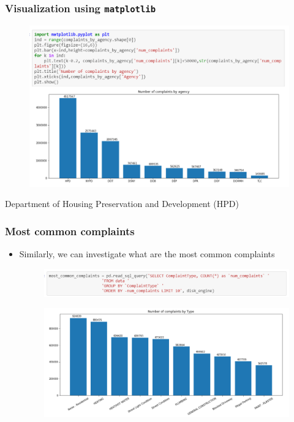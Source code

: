 \documentclass[red]{beamer}
\begin{document}
\begin{frame}
\frametitle{Visualization using \texttt{matplotlib}}
\begin{figure}
	\centering
	\includegraphics[width=1\linewidth]{figure/screenshot007}
\end{figure}
\vspace{-5mm}
Department of Housing Preservation and Development (HPD) 
\end{frame}

\begin{frame}
\frametitle{Most common complaints}
\begin{itemize}
	\item Similarly, we can investigate what are the most common complaints
	\begin{figure}
		\centering
		\includegraphics[width=1\linewidth]{figure/screenshot008}
	\end{figure}
	
	\begin{figure}
		\centering
		\includegraphics[width=1\linewidth]{figure/screenshot009}
	\end{figure}	
\end{itemize}
\end{frame}
\end{document}
